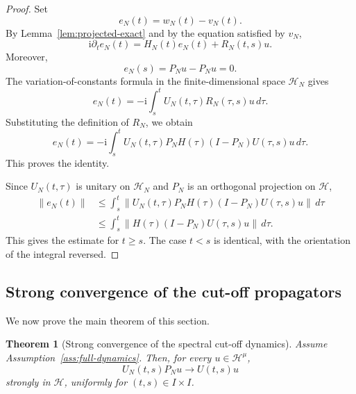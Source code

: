 \documentclass[10pt,a4paper]{amsart}
\newtheorem{theorem}{Theorem}[section]
\newcommand{\Hilb}{\mathcal H}
\newcommand{\ii}{\mathrm i}
\begin{document}
\begin{proof}
Set
\[
        e_N(t)=w_N(t)-v_N(t).
\]
By Lemma~\ref{lem:projected-exact} and by the equation satisfied by
\(v_N\),
\[
        \ii\partial_t e_N(t)
        =
        H_N(t)e_N(t)+R_N(t,s)u.
\]
Moreover,
\[
        e_N(s)=P_Nu-P_Nu=0.
\]
The variation-of-constants formula in the finite-dimensional space
\(\Hilb_N\) gives
\[
        e_N(t)
        =
        -\ii
        \int_s^t
        U_N(t,\tau)R_N(\tau,s)u
        \,d\tau .
\]
Substituting the definition of \(R_N\), we obtain
\[
        e_N(t)
        =
        -\ii
        \int_s^t
        U_N(t,\tau)
        P_NH(\tau)(I-P_N)U(\tau,s)u
        \,d\tau.
\]
This proves the identity.

Since \(U_N(t,\tau)\) is unitary on \(\Hilb_N\) and \(P_N\) is an
orthogonal projection on \(\Hilb\),
\[
\begin{aligned}
        \|e_N(t)\|
        &\leq
        \int_s^t
        \|U_N(t,\tau)
        P_NH(\tau)(I-P_N)U(\tau,s)u\|
        \,d\tau                                    \\
        &\leq
        \int_s^t
        \|H(\tau)(I-P_N)U(\tau,s)u\|
        \,d\tau .
\end{aligned}
\]
This gives the estimate for \(t\geq s\).  The case \(t<s\) is identical,
with the orientation of the integral reversed.
\end{proof}

\subsection{Strong convergence of the cut-off propagators}

We now prove the main theorem of this section.

\begin{theorem}[Strong convergence of the spectral cut-off dynamics]
\label{thm:strong-cutoff-convergence}
Assume Assumption~\ref{ass:full-dynamics}.  Then, for every
\(u\in\Hilb^\mu\),
\[
        U_N(t,s)P_Nu
        \longrightarrow
        U(t,s)u
\]
strongly in \(\Hilb\), uniformly for \((t,s)\in I\times I\).
\end{theorem}
\end{document}
